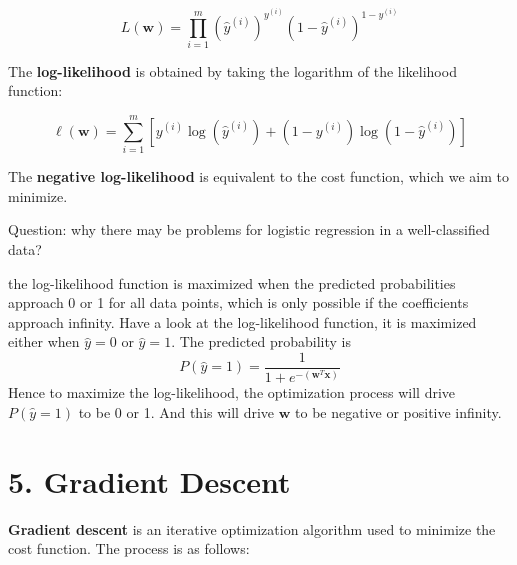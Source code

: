 \documentclass[
]{article}
\begin{document}
\[
L(\mathbf{w}) = \prod_{i=1}^m \left( \hat{y}^{(i)} \right)^{y^{(i)}} \left( 1 - \hat{y}^{(i)} \right)^{1 - y^{(i)}}
\]

The \textbf{log-likelihood} is obtained by taking the logarithm of the
likelihood function:

\[
\ell(\mathbf{w}) = \sum_{i=1}^m \left[ y^{(i)} \log(\hat{y}^{(i)}) + (1 - y^{(i)}) \log(1 - \hat{y}^{(i)}) \right]
\]

The \textbf{negative log-likelihood} is equivalent to the cost function,
which we aim to minimize.

Question: why there may be problems for logistic regression in a
well-classified data?

the log-likelihood function is maximized when the predicted
probabilities approach 0 or 1 for all data points, which is only
possible if the coefficients approach infinity. Have a look at the
log-likelihood function, it is maximized either when \(\hat y=0\) or
\(\hat y=1\). The predicted probability is \[
P(\hat y =1) =\frac{1}{1 + e^{-(\mathbf{w}^T \mathbf{x})}}
\] Hence to maximize the log-likelihood, the optimization process will
drive \(P(\hat y =1)\) to be 0 or 1. And this will drive \(\mathbf{w}\)
to be negative or positive infinity.

\section{5. Gradient Descent}\label{gradient-descent}

\textbf{Gradient descent} is an iterative optimization algorithm used to
minimize the cost function. The process is as follows:
\end{document}
